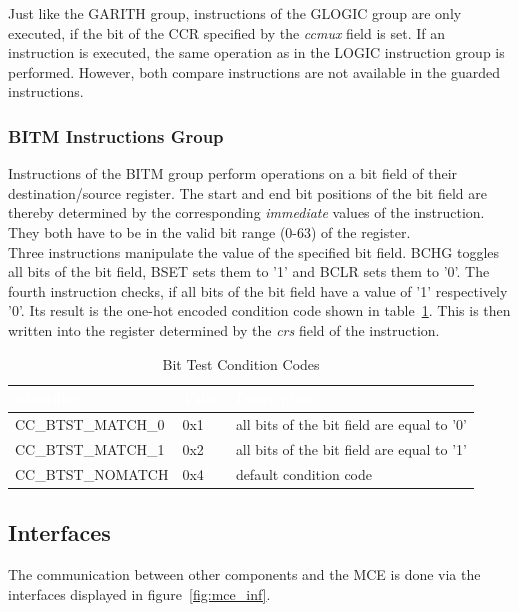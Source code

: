 Just like the GARITH group, instructions of the GLOGIC group are only executed, if the bit of the CCR specified by the \emph{ccmux} field is set.
If an instruction is executed, the same operation as in the LOGIC instruction group is performed.
However, both compare instructions are not available in the guarded instructions.

\subsubsection{BITM Instructions Group}

Instructions of the BITM group perform operations on a bit field of their destination/source register.
The start and end bit positions of the bit field are thereby determined by the corresponding \emph{immediate} values of the instruction.
They both have to be in the valid bit range (0-63) of the register.\\
Three instructions manipulate the value of the specified bit field.
BCHG toggles all bits of the bit field, BSET sets them to '1' and BCLR sets them to '0'.
The fourth instruction checks, if all bits of the bit field have a value of '1' respectively '0'.
Its result is the one-hot encoded condition code shown in table~\ref{btst_cond}.
This is then written into the register determined by the \emph{crs} field of the instruction. 

\begin{table}[htb]
\centering
\begin{tabular}{|l| l| l|}
    \hline
    \rowcolor{black!70}
    \textcolor{white}{\textbf{Identifier}} & \textcolor{white}{\textbf{Value}} & \textcolor{white}{\textbf{Description}} \\
    \hline
    CC\_BTST\_MATCH\_0 & 0x1 & all bits of the bit field are equal to '0'\\
    \hline
    \rowcolor{black!10}
    CC\_BTST\_MATCH\_1 & 0x2 & all bits of the bit field are equal to '1' \\
    \hline
    CC\_BTST\_NOMATCH  & 0x4 & default condition code \\
    \hline
\end{tabular}
\caption{Bit Test Condition Codes} \label{btst_cond}
\end{table}

\subsection{Interfaces}

The communication between other components and the MCE is done via the interfaces displayed in figure~\ref{fig:mce_inf}.


